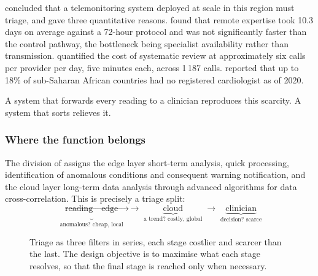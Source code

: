 \documentclass[12pt,a4paper,oneside]{report}
\begin{document}
 concluded that a telemonitoring system deployed at scale in this region must triage, and gave three quantitative reasons. \Textcite{bediang2021} found that remote expertise took 10.3 days on average against a 72-hour protocol and was not significantly faster than the control pathway, the bottleneck being specialist availability rather than transmission. \Textcite{kingue2013} quantified the cost of systematic review at approximately six calls per provider per day, five minutes each, across 1\,187 calls. \Textcite{segun2025} reported that up to 18\% of sub-Saharan African countries had no registered cardiologist as of 2020.

A system that forwards every reading to a clinician reproduces this scarcity. A system that sorts relieves it.

\subsubsection{Where the function belongs}

The division of \textcite{mucchi2021} assigns the edge layer short-term analysis, quick processing, identification of anomalous conditions and consequent warning notification, and the cloud layer long-term data analysis through advanced algorithms for data cross-correlation. This is precisely a triage split:
\begin{equation*}
  \underbrace{\text{reading} \rightarrow \text{edge}}_{\text{anomalous? cheap, local}}
  \;\longrightarrow\;
  \underbrace{\text{cloud}}_{\text{a trend? costly, global}}
  \;\longrightarrow\;
  \underbrace{\text{clinician}}_{\text{decision? scarce}}
\end{equation*}

\begin{figure}[htbp]
\centering
{}
\caption{Triage as three filters in series, each stage costlier and scarcer than the last. The design objective is to maximise what each stage resolves, so that the final stage is reached only when necessary.}\label{fig:triage-cascade}
\end{figure}
\end{document}
